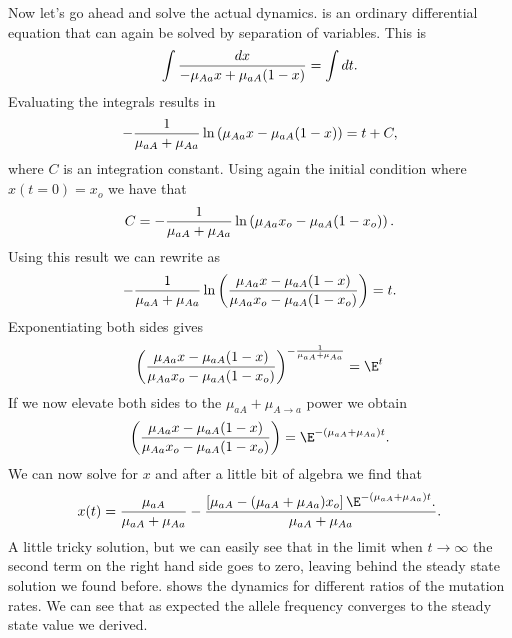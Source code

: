 Now let's go ahead and solve the actual dynamics.  is an
ordinary differential equation that can again be solved by separation of
variables. This is
\begin{equation}
  \int {dx \over - \mu_{A a} x + \mu_{a A} (1 - x)} = 
  \int dt.
\end{equation}
Evaluating the integrals results in
\begin{equation}
  -{1 \over \mu_{a A} + \mu_{A a}}
  \ln \left( \mu_{A a} x - \mu_{a A} (1 - x) \right) =
  t + C,
  \label{eq_mutation_int}
\end{equation}
where $C$ is an integration constant. Using again the initial condition where
$x(t=0) = x_o$ we have that
\begin{equation}
  C =  -{1 \over \mu_{a A} + \mu_{A a}}
  \ln \left( \mu_{A a} x_o - \mu_{a A} (1 - x_o) \right).
\end{equation}
Using this result we can rewrite  as
\begin{equation}
  -{1 \over \mu_{a A} + \mu_{A a}}
  \ln \left( { \mu_{A a} x - \mu_{a A} (1 - x)
    \over
  \mu_{A a} x_o - \mu_{a A} (1 - x_o)} \right) = t.
\end{equation}
Exponentiating both sides gives
\begin{equation}
  \left( { \mu_{A a} x - \mu_{a A} (1 - x)
    \over
  \mu_{A a} x_o - \mu_{a A} (1 - x_o)} \right)^{
    -{1 \over \mu_{a A} + \mu_{A a}}} = \E^t
\end{equation}
If we now elevate both sides to the $\mu_{a A} + \mu_{A\rightarrow
a}$ power we obtain
\begin{equation}
  \left( { \mu_{A a} x - \mu_{a A} (1 - x)
    \over
  \mu_{A a} x_o - \mu_{a A} (1 - x_o)} \right) =
  \E^{- (\mu_{a A} + \mu_{A a}) t}.
\end{equation}
We can now solve for $x$ and after a little bit of algebra we find that
\begin{equation}
  x(t) = {\mu_{a A} 
  \over 
  \mu_{a A} + \mu_{A a}} -
  {\left[  
  \mu_{a A} -
  (\mu_{a A} + \mu_{A a}) x_o
  \right] 
  \E^{- (\mu_{a A} + \mu_{A a}) t}.
  \over
  \mu_{a A} + \mu_{A a}}.
\end{equation}
A little tricky solution, but we can easily see that in the limit when $t
\rightarrow \infty$ the second term on the right hand side goes to zero,
leaving behind the steady state solution we found before. 
shows the dynamics for different ratios of the mutation rates. We can see that
as expected the allele frequency converges to the steady state value we
derived.

